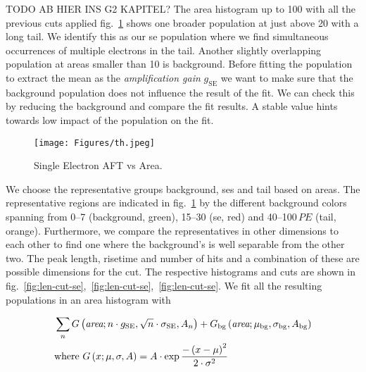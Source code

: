 TODO AB HIER INS G2 KAPITEL?
The area histogram up to \SI{100}{} with all the previous cuts applied fig.~\ref{fig:se-area-hist} shows one broader population at just above \SI{20}{} with a long tail.
We identify this as our \gls{se} population where we find simultaneous occurrences of multiple electrons in the tail.
Another slightly overlapping population at areas smaller than \SI{10}{} is background.
Before fitting the population to extract the mean as the \emph{amplification gain} $ g_\mathrm{SE} $ we want to make sure that the background population does not influence the result of the fit.
We can check this by reducing the background and compare the fit results.
A stable value hints towards low impact of the population on the fit.

\begin{figure}
    \centering
    \texttt{[image: Figures/th.jpeg]}  %
    \caption[Histogram Area Single Electrons and Background]{
        Single Electron AFT vs Area.
    }
    \label{fig:se-area-hist}
\end{figure}


We choose the representative groups background, \gls{se}s and tail based on areas.
The representative regions are indicated in fig.~\ref{fig:se-area-hist} by the different background colors spanning from \numrange{0}{7} (background, green), \numrange{15}{30} (\gls{se}, red) and \numrange{40}{100}$ \,\mathit{PE} $ (tail, orange).
Furthermore, we compare the representatives in other dimensions to each other to find one where the background's is well separable from the other two.
The peak length, risetime and number of hits and a combination of these are possible dimensions for the cut.
The respective histograms and cuts are shown in fig.~\ref{fig:len-cut-se},~\ref{fig:len-cut-se},~\ref{fig:len-cut-se}.
We fit all the resulting populations in an area histogram with %


\begin{align}
    &\sum_{n} G \left(  \textit{area}; n \cdot g_\mathrm{SE}, \sqrt{n} \cdot \sigma_\mathrm{SE}, A_n \right) +
    G_\mathrm{bg} \left( \textit{area};  \mu_\mathrm{bg}, \sigma_\mathrm{bg}, A_\mathrm{bg} \right) \\
    &\mathrm{where~} G \left( x;  \mu, \sigma, A \right) = A \cdot \exp{ \frac{-\left( x - \mu \right)^2}{2\cdot\sigma^2}}
    \label{eq:se-fit-model}
\end{align}


